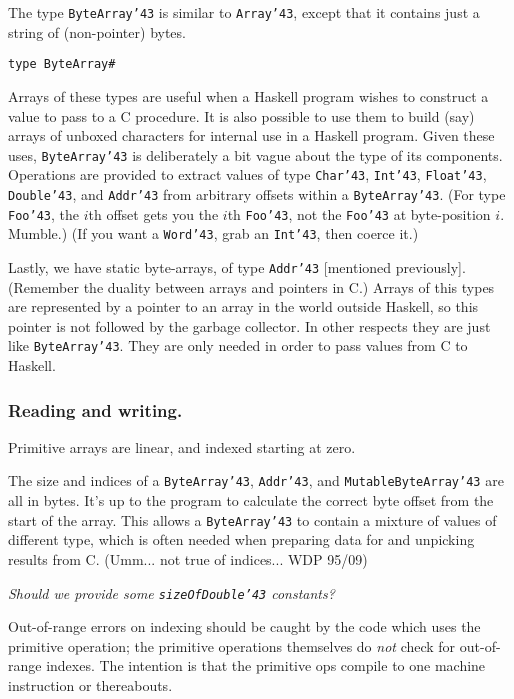 The type \mbox{\tt ByteArray{\char'43}} is similar to \mbox{\tt Array{\char'43}}, except that it contains
just a string of (non-pointer) bytes.
\begin{verbatim}
type ByteArray#
\end{verbatim}
Arrays of these types are useful when a Haskell program wishes to
construct a value to pass to a C procedure.  It is also possible to
use them to build (say) arrays of unboxed characters for internal use
in a Haskell program.  Given these uses, \mbox{\tt ByteArray{\char'43}} is deliberately
a bit vague about the type of its components.  Operations are provided
to extract values of type \mbox{\tt Char{\char'43}}, \mbox{\tt Int{\char'43}}, \mbox{\tt Float{\char'43}}, \mbox{\tt Double{\char'43}}, and
\mbox{\tt Addr{\char'43}} from arbitrary offsets within a \mbox{\tt ByteArray{\char'43}}.  (For type \mbox{\tt Foo{\char'43}},
the $i$th offset gets you the $i$th \mbox{\tt Foo{\char'43}}, not the \mbox{\tt Foo{\char'43}} at byte-position $i$.  Mumble.)
(If you want a \mbox{\tt Word{\char'43}}, grab an \mbox{\tt Int{\char'43}}, then coerce it.)

Lastly, we have static byte-arrays, of type \mbox{\tt Addr{\char'43}} [mentioned
previously].  (Remember the duality between arrays and pointers in C.)
Arrays of this types are represented by a pointer to an array in the
world outside Haskell, so this pointer is not followed by the garbage
collector.  In other respects they are just like \mbox{\tt ByteArray{\char'43}}.  They
are only needed in order to pass values from C to Haskell.

\subsubsection{Reading and writing.}

Primitive arrays are linear, and indexed starting at zero.

The size and indices of a \mbox{\tt ByteArray{\char'43}}, \mbox{\tt Addr{\char'43}}, and
\mbox{\tt MutableByteArray{\char'43}} are all in bytes.  It's up to the program to
calculate the correct byte offset from the start of the array.  This
allows a \mbox{\tt ByteArray{\char'43}} to contain a mixture of values of different
type, which is often needed when preparing data for and unpicking
results from C.  (Umm... not true of indices... WDP 95/09)

{\em Should we provide some \mbox{\tt sizeOfDouble{\char'43}} constants?}

Out-of-range errors on indexing should be caught by the code which
uses the primitive operation; the primitive operations themselves do
{\em not} check for out-of-range indexes. The intention is that the
primitive ops compile to one machine instruction or thereabouts.

